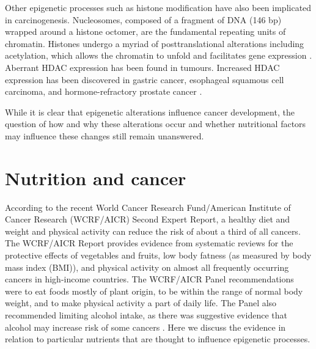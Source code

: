 \noindent Other epigenetic processes such as histone modification have also been implicated in carcinogenesis. Nucleosomes, composed of a fragment of DNA (146 bp) wrapped around a histone octomer, are the fundamental repeating units of chromatin. Histones undergo a myriad of posttranslational alterations including acetylation, which allows the chromatin to unfold and facilitates gene expression \cite{c224}. Aberrant HDAC expression has been found in tumours. Increased HDAC expression has been discovered in gastric cancer, esophageal squamous cell carcinoma, and hormone-refractory prostate cancer \cite{c225,c226}. 
 
\noindent While it is clear that epigenetic alterations influence cancer development, the question of how and why these alterations occur and whether nutritional factors may influence these changes still remain unanswered. 
 
\section{Nutrition and cancer} %
According to the recent World Cancer Research Fund/American Institute of Cancer Research (WCRF/AICR) Second Expert Report, a healthy diet and weight and physical activity can reduce the risk of about a third of all cancers. The WCRF/AICR Report provides evidence from systematic reviews for the protective effects of vegetables and fruits, low body fatness (as measured by body mass index (BMI)), and physical activity on almost all frequently occurring cancers in high-income countries. The WCRF/AICR Panel recommendations were to eat foods mostly of plant origin, to be within the range of normal body weight, and to make physical activity a part of daily life. The Panel also recommended limiting alcohol intake, as there was suggestive evidence that alcohol may increase risk of some cancers \cite{c214}. Here we discuss the evidence in relation to particular nutrients that are thought to influence epigenetic processes. 
 
